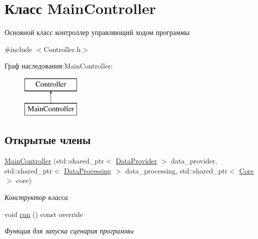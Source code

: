 \hypertarget{class_main_controller}{}\section{Класс Main\+Controller}
\label{class_main_controller}


Основной класс контроллер управляющий ходом программы  




{\ttfamily \#include $<$Controller.\+h$>$}

Граф наследования\+:Main\+Controller\+:\begin{figure}[H]
\begin{center}
\leavevmode
\includegraphics[height=2.000000cm]{class_main_controller}
\end{center}
\end{figure}
\subsection*{Открытые члены}
\begin{DoxyCompactItemize}
\item 
\mbox{\hyperlink{class_main_controller_acec97760f70f518bf7d237af380c7255}{Main\+Controller}} (std\+::shared\+\_\+ptr$<$ \mbox{\hyperlink{class_data_provider}{Data\+Provider}} $>$ data\+\_\+provider, std\+::shared\+\_\+ptr$<$ \mbox{\hyperlink{class_data_processing}{Data\+Processing}} $>$ data\+\_\+processing, std\+::shared\+\_\+ptr$<$ \mbox{\hyperlink{class_core}{Core}} $>$ core)
\begin{DoxyCompactList}\small\item\em Конструктор класса \end{DoxyCompactList}\item 
\mbox{\label{class_main_controller_a5988de20a9d4f3d84cb7e3dabe2f6eec}} 
void \mbox{\hyperlink{class_main_controller_a5988de20a9d4f3d84cb7e3dabe2f6eec}{run}} () const override
\begin{DoxyCompactList}\small\item\em Функция для запуска сценария программы \end{DoxyCompactList}\end{DoxyCompactItemize}


